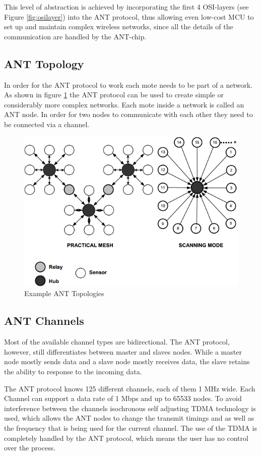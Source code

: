 This level of abstraction is achieved by incorporating the first 4 OSI-layers (see Figure \ref{fig:osilayer}) into the ANT protocol, thus allowing even low-cost MCU to set up and maintain complex wireless networks, since all the details of the communication are handled by the ANT-chip.

\subsection{ANT Topology}
In order for the ANT protocol to work each mote needs to be part of a network. As shown in figure \ref{fig:anttopo} the ANT protocol can be used to create simple or considerably more complex networks. Each mote inside a network is called an ANT node. In order for two nodes to communicate with each other they need to be connected via a channel.

\begin{figure}[h]
	\centering
	\includegraphics[scale=0.7]{./pics/ANTtopo.png}
	\caption{Example ANT Topologies\cite{DynastreamInnovationsInc.2013}}\label{fig:anttopo}
\end{figure}

\subsection{ANT Channels}
Most of the available channel types are bidirectional. The ANT protocol, however, still differentiates between master and slaves nodes. While a master node mostly sends data and a slave node mostly receives data, the slave retains the ability to response to the incoming data.

The ANT protocol knows 125 different channels, each of them 1 MHz wide. Each Channel can support a data rate of 1 Mbps and up to 65533 nodes. To avoid interference between the channels isochronous self adjusting TDMA technology is used, which allows the ANT nodes to change the transmit timings and as well as the frequency that is being used for the current channel. The use of the TDMA is completely handled by the ANT protocol, which means the user has no control over the process.

